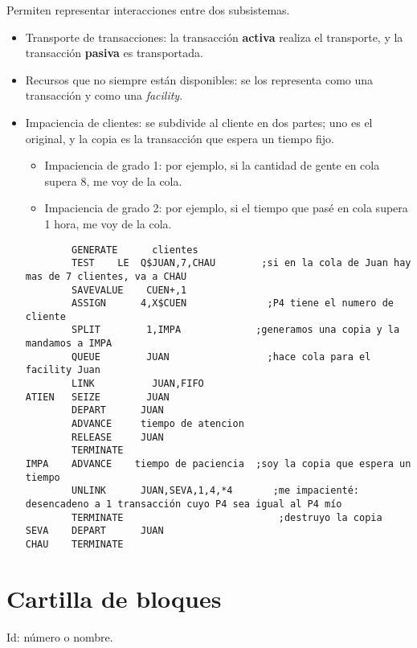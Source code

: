 \documentclass[12pt,a4paper, twoside]{paquetes-apunte/apunte}
\begin{document}
Permiten representar interacciones entre dos subsistemas.
\begin{itemize}
\item Transporte de transacciones: la transacción \textbf{activa} realiza
el transporte, y la transacción \textbf{pasiva} es transportada.
\item Recursos que no siempre están disponibles: se los representa como
una transacción y como una \emph{facility}.
\item Impaciencia de clientes: se subdivide al cliente en dos partes; uno
es el original, y la copia es la transacción que espera un tiempo
fijo.

\begin{itemize}
\item Impaciencia de grado 1: por ejemplo, si la cantidad de gente en cola
supera 8, me voy de la cola.
\item Impaciencia de grado 2: por ejemplo, si el tiempo que pasé en cola
supera 1 hora, me voy de la cola.
\end{itemize}

\begin{lstlisting}
		GENERATE	  clientes	
		TEST	LE	Q$JUAN,7,CHAU		 ;si en la cola de Juan hay mas de 7 clientes, va a CHAU
		SAVEVALUE	 CUEN+,1
		ASSIGN		4,X$CUEN			  ;P4 tiene el numero de cliente
		SPLIT		 1,IMPA				;generamos una copia y la mandamos a IMPA
		QUEUE		 JUAN				  ;hace cola para el facility Juan
		LINK		  JUAN,FIFO
ATIEN   SEIZE		 JUAN
		DEPART		JUAN
		ADVANCE		tiempo de atencion
		RELEASE		JUAN
		TERMINATE
IMPA	ADVANCE	   tiempo de paciencia	;soy la copia que espera un tiempo
		UNLINK		JUAN,SEVA,1,4,*4	   ;me impacienté: desencadeno a 1 transacción cuyo P4 sea igual al P4 mío
		TERMINATE							;destruyo la copia
SEVA	DEPART	    JUAN
CHAU	TERMINATE
\end{lstlisting}


\end{itemize}
\pagebreak{}


\section{Cartilla de bloques}

Id: número o nombre.
\end{document}

